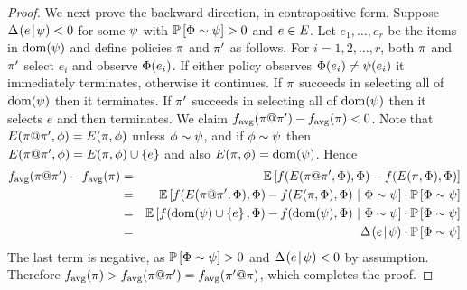 \begin{proof}
We next prove the backward direction, in contrapositive form. 
Suppose $\Delta \hspace{-0.3mm} \left( { {e}\! \mid \! {{\color{black}{\ensuremath{\psi}}}} } \right)   < 0$ for some ${\color{black}{\ensuremath{\psi}}}$ with $\mathbb{P}\left[{\color{black}{\ensuremath{\Phi}}} \sim {\color{black}{\ensuremath{\psi}}}\right]  > 0$ and $e \in E$.
Let $e_1, \ldots, e_r$  be the items in $\operatorname{dom}({\color{black}{\ensuremath{\psi}}})$ and define policies 
$\pi$ and $\pi'$ as follows.  For $i = 1, 2, \ldots, r$, both
$\pi$ and $\pi'$ select $e_i$ and observe ${\color{black}{\ensuremath{\Phi}}}(e_i)$.
If either policy observes ${\color{black}{\ensuremath{\Phi}}}(e_i) \neq {\color{black}{\ensuremath{\psi}}}(e_i)$ it immediately terminates, otherwise it continues.
If $\pi$ succeeds in selecting all of $\operatorname{dom}({\color{black}{\ensuremath{\psi}}})$ then it terminates.
If $\pi'$ succeeds in selecting all of $\operatorname{dom}({\color{black}{\ensuremath{\psi}}})$ then it selects $e$ and then terminates.
We claim $f_{\text{avg}}( {\pi}@{\pi'}) - f_{\text{avg}}(\pi) < 0$.
Note that 
%
%
%
$E({ {\pi}@{\pi'} }, {{\color{black}{\ensuremath{\phi}}}}) = E({\pi }, {{\color{black}{\ensuremath{\phi}}}})$ unless ${\color{black}{\ensuremath{\phi}}} \sim {\color{black}{\ensuremath{\psi}}}$, and if 
${\color{black}{\ensuremath{\phi}}} \sim {\color{black}{\ensuremath{\psi}}}$ then 
$E({ {\pi}@{\pi'} }, {{\color{black}{\ensuremath{\phi}}}}) = E({\pi }, {{\color{black}{\ensuremath{\phi}}}}) \cup \left\{e\right\}$ and also 
$E({\pi }, {{\color{black}{\ensuremath{\phi}}}})= \operatorname{dom}({\color{black}{\ensuremath{\psi}}})$.  
Hence 
\begin{eqnarray*}
  \label{eq:1app}
  \avgf( \append{\policy}{\policy'}) - \avgf(\policy) & = & 
 \expctoverrlz{\rvrlz}{f( \played{ \append{\policy}{\policy'} }{\rvrlz}  , \rvrlz) -
   f(  \played{\policy }{\rvrlz}  , \rvrlz)} \\ 
 & = & \expctoverrlz{\rvrlz}{f( \played{ \append{\policy}{\policy'} }{\rvrlz}  , \rvrlz) -
   f( \played{\policy }{\rvrlz}   , \rvrlz) \ | \ \rvrlz\sim\prlz }\cdot  \proboverrlz{\rvrlz}{\rvrlz \sim \prlz}  \\
 & = & \expctoverrlz{\rvrlz}{f(  \dom(\prlz) \cup \set{e}, \rvrlz) -
   f( \dom(\prlz) , \rvrlz) \ | \ \rvrlz\sim\prlz } \cdot \proboverrlz{\rvrlz}{\rvrlz \sim \prlz} \\
 & = & \diff{\prlz}{\elem} \cdot \proboverrlz{\rvrlz}{\rvrlz \sim \prlz}
\end{eqnarray*}
The last term is negative, as $\mathbb{P}\left[{\color{black}{\ensuremath{\Phi}}} \sim {\color{black}{\ensuremath{\psi}}}\right]  > 0$ and $ \Delta \hspace{-0.3mm} \left( { {e}\! \mid \! {{\color{black}{\ensuremath{\psi}}}} } \right)   < 0$ by assumption.
Therefore
$f_{\text{avg}}(\pi) > f_{\text{avg}}( {\pi}@{\pi'}) = f_{\text{avg}}( {\pi'}@{\pi})$, which completes the proof.
\end{proof}
%
%
%





